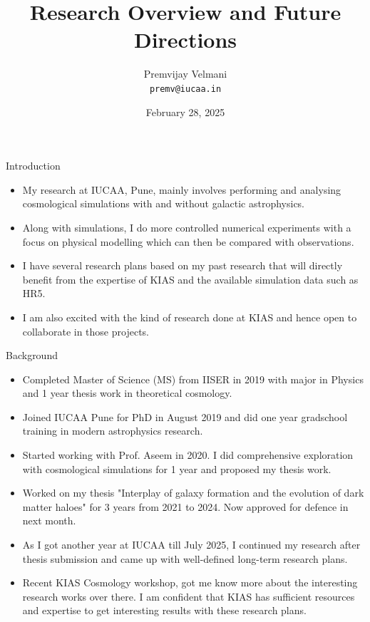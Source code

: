 \documentclass{beamer}
\title[Research Overview]{Research Overview and Future Directions}
\author[Premvijay Velmani]{Premvijay Velmani \\ \texttt{premv@iucaa.in}}
\institute[IUCAA]{Inter-University Centre for Astronomy and Astrophysics (IUCAA)}
\date[Interview with Prof Raul Angulo]{February 28, 2025}
\begin{document}
\begin{frame}
    \titlepage
\end{frame}



\begin{frame}{Introduction}
\begin{itemize}
\item My research at IUCAA, Pune, mainly involves performing and analysing cosmological simulations with and without galactic astrophysics.
\item Along with simulations, I do more controlled numerical experiments with a focus on physical modelling which can then be compared with observations.
\item I have several research plans based on my past research that will directly benefit from the expertise of KIAS and the available simulation data such as HR5. 
\item I am also excited with the kind of research done at KIAS and hence open to collaborate in those projects.
\end{itemize}
\end{frame}

\begin{frame}{Background}
    \begin{itemize}
        \item Completed Master of Science (MS) from IISER in 2019 with major in Physics and 1 year thesis work in theoretical cosmology.
        \item Joined IUCAA Pune for PhD in August 2019 and did one year gradschool training in modern astrophysics research.
        \item Started working with Prof. Aseem in 2020. I did comprehensive exploration with cosmological simulations for 1 year and proposed my thesis work.
        \item Worked on my thesis "Interplay of galaxy formation and the evolution of dark matter haloes" for 3 years from 2021 to 2024. Now approved for defence in next month.
        \item As I got another year at IUCAA till July 2025, I continued my research after thesis submission and came up with well-defined long-term research plans. 
        \item Recent KIAS Cosmology workshop, got me know more about the interesting research works over there. I am confident that KIAS has sufficient resources and expertise to get interesting results with these research plans.
    \end{itemize}
\end{frame}
\end{document}
